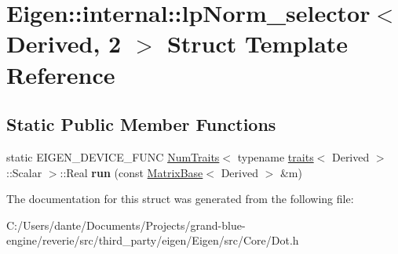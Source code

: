 \hypertarget{struct_eigen_1_1internal_1_1lp_norm__selector_3_01_derived_00_012_01_4}{}\section{Eigen\+::internal\+::lp\+Norm\+\_\+selector$<$ Derived, 2 $>$ Struct Template Reference}
\label{struct_eigen_1_1internal_1_1lp_norm__selector_3_01_derived_00_012_01_4}
\subsection*{Static Public Member Functions}
\begin{DoxyCompactItemize}
\item 
\mbox{\label{struct_eigen_1_1internal_1_1lp_norm__selector_3_01_derived_00_012_01_4_a35407fefaed1229fa4860301b0e1a130}} 
static E\+I\+G\+E\+N\+\_\+\+D\+E\+V\+I\+C\+E\+\_\+\+F\+U\+NC \mbox{\hyperlink{struct_eigen_1_1_num_traits}{Num\+Traits}}$<$ typename \mbox{\hyperlink{struct_eigen_1_1internal_1_1traits}{traits}}$<$ Derived $>$\+::Scalar $>$\+::Real {\bfseries run} (const \mbox{\hyperlink{class_eigen_1_1_matrix_base}{Matrix\+Base}}$<$ Derived $>$ \&m)
\end{DoxyCompactItemize}


The documentation for this struct was generated from the following file\+:\begin{DoxyCompactItemize}
\item 
C\+:/\+Users/dante/\+Documents/\+Projects/grand-\/blue-\/engine/reverie/src/third\+\_\+party/eigen/\+Eigen/src/\+Core/Dot.\+h\end{DoxyCompactItemize}
